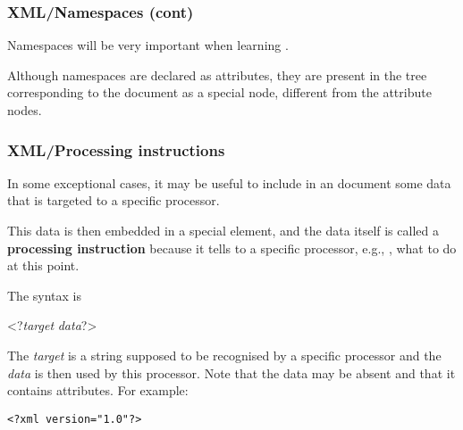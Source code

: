 %
\begin{frame}
\frametitle{XML/Namespaces (cont)}

Namespaces will be very important when learning \XSLT.

\bigskip

Although namespaces are declared as attributes, they are present in
the \XML tree corresponding to the document as a special node,
different from the attribute nodes.

\end{frame}

%
\begin{frame}[containsverbatim]
\frametitle{XML/Processing instructions}

In some exceptional cases, it may be useful to include in an \XML
document some data that is targeted to a specific \XML processor.

\bigskip

This data is then embedded in a special element, and the data itself
is called a \textbf{processing instruction} because it tells to a
specific processor, e.g., \Saxon, what to do at this point.

\bigskip

The syntax is
\begin{semiverbatim}
<?\textit{target} \textit{data}?>
\end{semiverbatim}
The \emph{target} is a string supposed to be recognised by a specific
\XML processor and the \emph{data} is then used by this
processor. Note that the data may be absent and that it contains
attributes. For example:
\begin{verbatim}
<?xml version="1.0"?>
\end{verbatim}

\end{frame}

